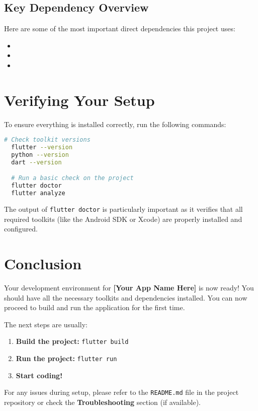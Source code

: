 \documentclass[11pt]{article}
\begin{document}
\subsection{Key Dependency Overview}
Here are some of the most important direct dependencies this project uses:
\begin{itemize}
    \item %
    \item %
    \item  %
\end{itemize}

\section{Verifying Your Setup}
To ensure everything is installed correctly, run the following commands:

\begin{lstlisting}[language=bash]
  # Check toolkit versions
  flutter --version
  python --version
  dart --version

  # Run a basic check on the project
  flutter doctor
  flutter analyze
\end{lstlisting}

The output of \texttt{flutter doctor} is particularly important as it verifies that all required toolkits (like the Android SDK or Xcode) are properly installed and configured.

\section{Conclusion}
Your development environment for \textbf{[Your App Name Here]} is now ready! You should have all the necessary toolkits and dependencies installed. You can now proceed to build and run the application for the first time.

The next steps are usually:
\begin{enumerate}
    \item \textbf{Build the project:} \texttt{flutter build}
    \item \textbf{Run the project:} \texttt{flutter run}
    \item \textbf{Start coding!}
\end{enumerate}

For any issues during setup, please refer to the \texttt{README.md} file in the project repository or check the \textbf{Troubleshooting} section (if available).
\end{document}
